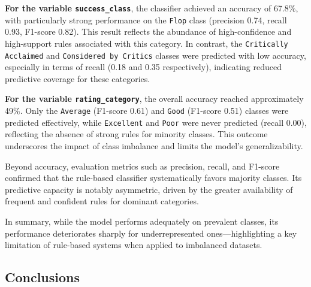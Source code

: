 \documentclass[10pt]{article}
\begin{document}
\textbf{For the variable \texttt{success\_class}}, the classifier achieved an accuracy of 67.8\%, with particularly strong performance on the \texttt{Flop} class (precision 0.74, recall 0.93, F1-score 0.82). This result reflects the abundance of high-confidence and high-support rules associated with this category. In contrast, the \texttt{Critically Acclaimed} and \texttt{Considered by Critics} classes were predicted with low accuracy, especially in terms of recall (0.18 and 0.35 respectively), indicating reduced predictive coverage for these categories.

\textbf{For the variable \texttt{rating\_category}}, the overall accuracy reached approximately 49\%. Only the \texttt{Average} (F1-score 0.61) and \texttt{Good} (F1-score 0.51) classes were predicted effectively, while \texttt{Excellent} and \texttt{Poor} were never predicted (recall 0.00), reflecting the absence of strong rules for minority classes. This outcome underscores the impact of class imbalance and limits the model's generalizability.

Beyond accuracy, evaluation metrics such as precision, recall, and F1-score confirmed that the rule-based classifier systematically favors majority classes. Its predictive capacity is notably asymmetric, driven by the greater availability of frequent and confident rules for dominant categories.

In summary, while the model performs adequately on prevalent classes, its performance deteriorates sharply for underrepresented ones—highlighting a key limitation of rule-based systems when applied to imbalanced datasets.


\subsection{Conclusions}
\end{document}
